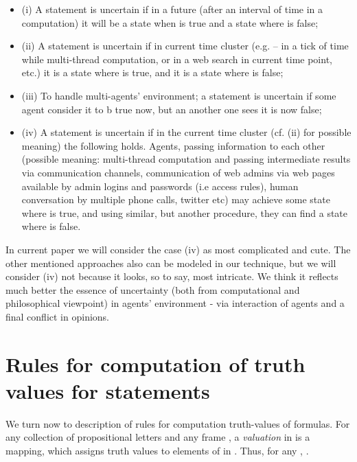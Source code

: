 \documentclass[runningheads]{llncs}
\begin{document}
 \smallskip
 
\begin{itemize}
\item{(i)}
A statement  is uncertain if in  a future (after an interval of time in a computation) it will be a state when  is true and a state where  is false;

\vspace*{0.3cm}
\item{(ii)}
A statement  is uncertain if in current time cluster (e.g. -- in a tick of time while multi-thread computation, or in a web search in current time point, etc.) it is a state where  is true, and  it is  a state where  is false;

\vspace*{0.3cm}
\item{(iii)} To handle multi-agents' environment;
 a statement  is uncertain if some agent consider it to b true now, but an another one sees it is now false;


\vspace*{0.3cm}
\item{(iv)}
A statement  is uncertain if in the current time cluster (cf. (ii) for possible meaning) the following holds. Agents, passing information to each other (possible meaning: multi-thread computation and passing intermediate results via communication channels, communication of web admins via web pages available by admin logins and passwords (i.e access rules), human conversation by multiple phone calls, twitter etc) may achieve some state where  is true, and using similar, but another
procedure, they can find a state where  is false.
\end{itemize}


In current paper we will consider the case (iv) as most complicated and cute.
The other mentioned approaches also can be modeled in our technique, but we will consider (iv) not because it looks, so to say, most intricate. We think it reflects
 much better the essence of uncertainty (both from computational and philosophical
viewpoint) in agents' environment - via interaction of agents and a final conflict in opinions.




\section{Rules for computation of truth values for statements}

We turn now to description of rules
 for computation truth-values of formulas. For
any collection of propositional letters  and any
frame , a \emph{valuation} in   is a mapping, which
 assigns truth values to elements of  in
.   Thus, for any
 , .
\end{document}
